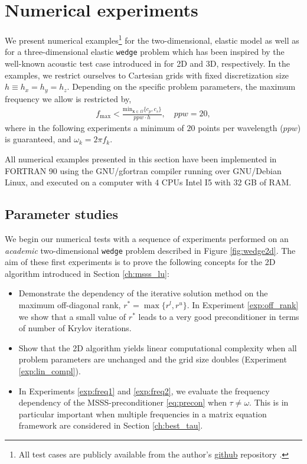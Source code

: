 \section{Numerical experiments}
\label{ch:num}
We present numerical examples\footnote{All test cases are publicly available from the author's \href{https://github.com/ManuelMBaumann/elastic_benchmarks}{github} repository \cite{Bgithub}.} for the two-dimensional, elastic \marmousi model \cite{marm2} as well as for a three-di\-men\-sional elastic \texttt{wedge} problem which has been inspired by the well-known acoustic test case introduced in \cite{Knibbe2016,PM04} for 2D and 3D, respectively. In the examples, we restrict ourselves to Cartesian grids with fixed discretization size \mbox{$h \equiv h_x = h_y = h_z$}. Depending on the specific problem parameters, the maximum frequency we allow is restricted by,
\begin{align*}
f_\text{max} < \frac{\text{min}_{\mathbf{x} \in \Omega}\{c_p,c_s\}}{ppw \cdot h}, \quad ppw = 20,
\end{align*}
where in the following experiments a minimum of $20$ points per wavelength ($ppw$) is guaranteed, and $\omega_k = 2 \pi f_k$.

All numerical examples presented in this section have been implemented in FORTRAN 90
using the GNU/gfortran compiler running over GNU/Debian Linux, and executed on a computer with 
4 CPUs Intel I5 with 32 GB of RAM.
\subsection{Parameter studies}
 We begin our numerical tests with a sequence of experiments performed on an \textit{academic} two-dimensional \texttt{wedge} problem described in Figure \ref{fig:wedge2d}. The aim of these first experiments is to prove the following concepts for the 2D algorithm introduced in Section \ref{ch:msss_lu}:
 \begin{itemize}
  \item Demonstrate the dependency of the iterative solution meth\-od on the maximum off-di\-ag\-o\-nal rank, $r^\ast = \max \{ r^l, r^u\}$. In Experiment \ref{exp:off_rank} we show that a small value of $r^\ast$ leads to a very good preconditioner in terms of number of Krylov iterations.
  \item Show that the 2D algorithm yields linear computational complexity when all problem parameters are unchanged and the grid size doubles (Experiment \ref{exp:lin_compl}).
  \item In Experiments \ref{exp:freq1} and \ref{exp:freq2}, we evaluate the frequency dependency of the MSSS-preconditioner \eqref{eq:precon} when $\tau \neq \omega$. This is in particular important when multiple frequencies in a matrix equation framework are considered in Section \ref{ch:best_tau}.
 \end{itemize}
 
